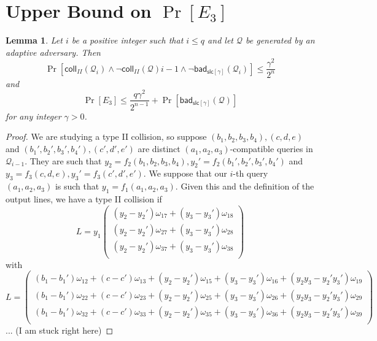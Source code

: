 \documentclass[12pt,a4paper]{article}
\newcommand{\coll}[1]{\mathsf{coll}_{#1}(\mathcal{Q})}
\newcommand{\colli}[2]{\mathsf{coll}_{#1}(\mathcal{Q}_{#2})}
\newcommand{\badslc}{\mathsf{bad}_{\mathsf{slc}[\gamma]}(\mathcal{Q})}
\newcommand{\badslci}[1]{\mathsf{bad}_{\mathsf{slc}[\gamma]}(\mathcal{Q}_{#1})}
\newtheorem*{lemma}{Lemma}
\begin{document}
\section*{Upper Bound on $\Pr[E_3]$}
\begin{lemma}
    Let $i$ be a positive integer such that $i\leq q$ and let $\mathcal{Q}$ be generated by an adaptive adversary. Then
    \[
        \Pr[\colli{II}{i} \land \lnot\coll{II}{i-1}\land\lnot\badslci{i}] \leq \frac{\gamma^2}{2^n}
    \]
    and
    \[
        \Pr[E_3] \leq \frac{q \gamma^2}{2^{n-1}} + \Pr[\badslc]
    \]
    for any integer $\gamma > 0$.
\end{lemma}
\begin{proof}
We are studying a type II collision, so suppose $(b_1,b_2,b_3,b_4),(c,d,e)$ and $(b_1',b_2',b_3',b_4'),(c',d',e')$ are distinct $(a_1,a_2,a_3)$-compatible queries in $\mathcal{Q}_{i-1}$.
They are such that $y_2 = f_2(b_1,b_2,b_3,b_4), y_2' = f_2(b_1',b_2',b_3',b_4')$ and $y_3 = f_3(c,d,e), y_3' = f_3(c',d',e')$. We suppose that our $i$-th query $(a_1,a_2,a_3)$
is such that $y_1 = f_1(a_1,a_2,a_3)$. Given this and the definition of the output lines, we have a type II collision if
\[
    L = y_1 \left(
    \begin{array}{l}
        (y_2-y_2')\omega_{17} + (y_3 - y_3')\omega_{18}\\
        (y_2-y_2')\omega_{27} + (y_3 - y_3')\omega_{28}\\
        (y_2-y_2')\omega_{37} + (y_3 - y_3')\omega_{38}\\
    \end{array}
    \right)
\]
with
\[
    L= 
    \left(
    \begin{array}{l}
        (b_1-b_1')\omega_{12} + (c - c')\omega_{13} + (y_2-y_2')\omega_{15} + (y_3-y_3')\omega_{16} + (y_2y_3 - y_2'y_3')\omega_{19}\\
        (b_1-b_1')\omega_{22} + (c - c')\omega_{23} + (y_2-y_2')\omega_{25} + (y_3-y_3')\omega_{26} + (y_2y_3 - y_2'y_3')\omega_{29}\\
        (b_1-b_1')\omega_{32} + (c - c')\omega_{33} + (y_2-y_2')\omega_{35} + (y_3-y_3')\omega_{36} + (y_2y_3 - y_2'y_3')\omega_{39}\\
    \end{array} \right)
\]
... (I am stuck right here)
\end{proof}
\end{document}
